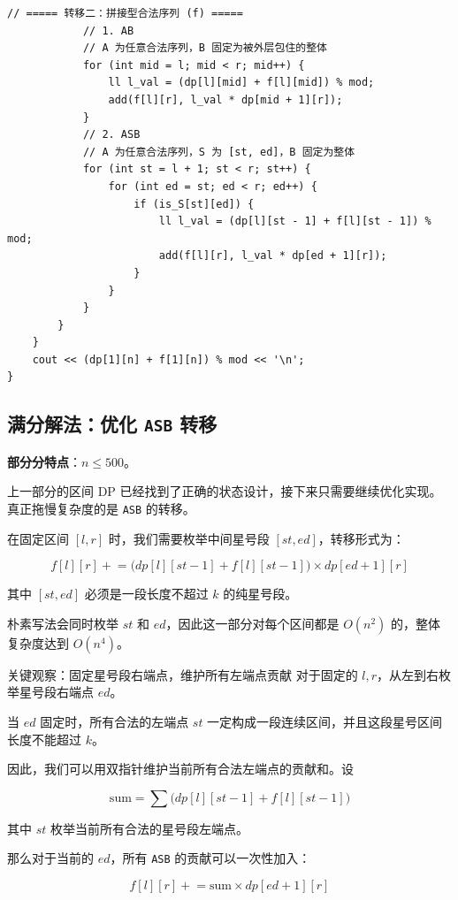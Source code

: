 \documentclass{book}
\newcommand{\code}[1]{\colorbox{codebg}{\texttt{#1}}}  %
\begin{document}
\begin{lstlisting}[style = code]
            // ===== 转移二：拼接型合法序列 (f) =====
            // 1. AB 
            // A 为任意合法序列，B 固定为被外层包住的整体
            for (int mid = l; mid < r; mid++) {
                ll l_val = (dp[l][mid] + f[l][mid]) % mod;
                add(f[l][r], l_val * dp[mid + 1][r]);
            }
            // 2. ASB 
            // A 为任意合法序列，S 为 [st, ed]，B 固定为整体
            for (int st = l + 1; st < r; st++) {
                for (int ed = st; ed < r; ed++) {
                    if (is_S[st][ed]) {
                        ll l_val = (dp[l][st - 1] + f[l][st - 1]) % mod;
                        add(f[l][r], l_val * dp[ed + 1][r]);
                    }
                }
            }
        }
    }
    cout << (dp[1][n] + f[1][n]) % mod << '\n';
}
\end{lstlisting}

\newpage
\subsection{满分解法：优化 \code{ASB} 转移}

\textbf{部分分特点}：$n\le 500$。

上一部分的区间 DP 已经找到了正确的状态设计，接下来只需要继续优化实现。真正拖慢复杂度的是 \code{ASB} 的转移。

在固定区间 $[l,r]$ 时，我们需要枚举中间星号段 $[st,ed]$，转移形式为：

$$
f[l][r]\mathrel{+}=
\bigl(dp[l][st-1]+f[l][st-1]\bigr)\times dp[ed+1][r]
$$

其中 $[st,ed]$ 必须是一段长度不超过 $k$ 的纯星号段。

朴素写法会同时枚举 $st$ 和 $ed$，因此这一部分对每个区间都是 $O(n^2)$ 的，整体复杂度达到 $O(n^4)$。

\begin{keybox}{关键观察：固定星号段右端点，维护所有左端点贡献}
对于固定的 $l,r$，从左到右枚举星号段右端点 $ed$。

当 $ed$ 固定时，所有合法的左端点 $st$ 一定构成一段连续区间，并且这段星号区间长度不能超过 $k$。

因此，我们可以用双指针维护当前所有合法左端点的贡献和。设

$$
\mathrm{sum}
=
\sum
\bigl(dp[l][st-1]+f[l][st-1]\bigr)
$$

其中 $st$ 枚举当前所有合法的星号段左端点。

那么对于当前的 $ed$，所有 \code{ASB} 的贡献可以一次性加入：

$$
f[l][r]\mathrel{+}=
\mathrm{sum}\times dp[ed+1][r]
$$
\end{keybox}
\end{document}
